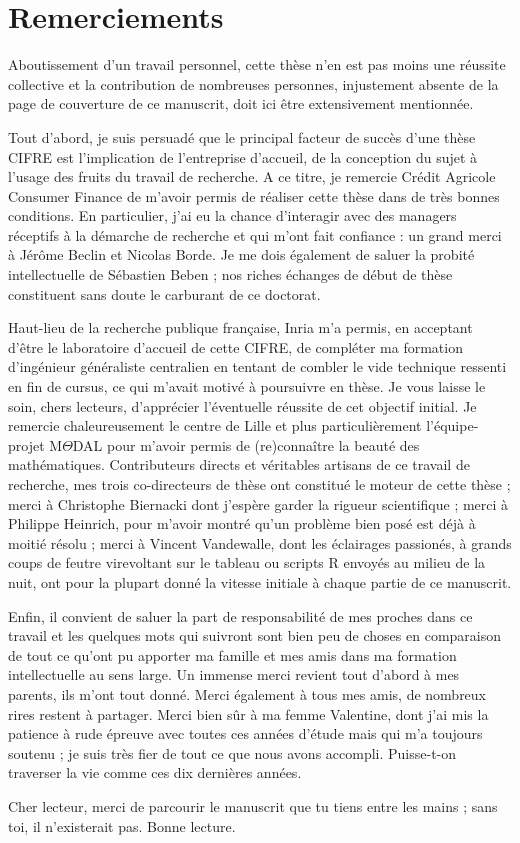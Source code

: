 \chapter{Remerciements}

Aboutissement d'un travail personnel, cette thèse n'en est pas moins une réussite collective et la contribution de nombreuses personnes, injustement absente de la page de couverture de ce manuscrit, doit ici être extensivement mentionnée.

Tout d'abord, je suis persuadé que le principal facteur de succès d'une thèse CIFRE est l'implication de l'entreprise d'accueil, de la conception du sujet à l'usage des fruits du travail de recherche. A ce titre, je remercie Crédit Agricole Consumer Finance de m'avoir permis de réaliser cette thèse dans de très bonnes conditions. En particulier, j'ai eu la chance d'interagir avec des managers réceptifs à la démarche de recherche et qui m'ont fait confiance : un grand merci à Jérôme Beclin et Nicolas Borde. Je me dois également de saluer la probité intellectuelle de Sébastien Beben ; nos riches échanges de début de thèse constituent sans doute le carburant de ce doctorat.

Haut-lieu de la recherche publique française, Inria m'a permis, en acceptant d'être le laboratoire d'accueil de cette CIFRE, de compléter ma formation d'ingénieur généraliste centralien en tentant de combler le vide technique ressenti en fin de cursus, ce qui m'avait motivé à poursuivre en thèse. Je vous laisse le soin, chers lecteurs, d'apprécier l'éventuelle réussite de cet objectif initial. Je remercie chaleureusement le centre de Lille et plus particulièrement l'équipe-projet M$\Theta$DAL pour m'avoir permis de (re)connaître la beauté des mathématiques. Contributeurs directs et véritables artisans de ce travail de recherche, mes trois co-directeurs de thèse ont constitué le moteur de cette thèse ; merci à Christophe Biernacki dont j'espère garder la rigueur scientifique ; merci à Philippe Heinrich, pour m'avoir montré qu'un problème bien posé est déjà à moitié résolu ; merci à Vincent Vandewalle, dont les éclairages passionés, à grands coups de feutre virevoltant sur le tableau ou scripts \textsf{R} envoyés au milieu de la nuit, ont pour la plupart donné la vitesse initiale à chaque partie de ce manuscrit.

Enfin, il convient de saluer la part de responsabilité de mes proches dans ce travail et les quelques mots qui suivront sont bien peu de choses en comparaison de tout ce qu'ont pu apporter ma famille et mes amis dans ma formation intellectuelle au sens large. Un immense merci revient tout d'abord à mes parents, ils m'ont tout donné. Merci également à tous mes amis, de nombreux rires restent à partager. Merci bien sûr à ma femme Valentine, dont j'ai mis la patience à rude épreuve avec toutes ces années d'étude mais qui m'a toujours soutenu ; je suis très fier de tout ce que nous avons accompli. Puisse-t-on traverser la vie comme ces dix dernières années.

Cher lecteur, merci de parcourir le manuscrit que tu tiens entre les mains ; sans toi, il n'existerait pas. Bonne lecture.